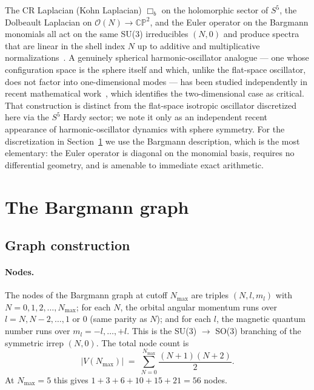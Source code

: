 \documentclass[twocolumn,pra,amsmath,amssymb,superscriptaddress]{revtex4-2}
\begin{document}
The CR Laplacian (Kohn Laplacian) $\Box_b$ on the holomorphic
sector of $S^5$, the Dolbeault Laplacian on $\mathcal{O}(N) \to
\mathbb{CP}^2$, and the Euler operator on the Bargmann monomials
all act on the same SU(3) irreducibles $(N, 0)$ and produce
spectra that are linear in the shell index $N$ up to additive and
multiplicative normalizations~\cite{follandstein1974}.  A
genuinely spherical harmonic-oscillator analogue --- one whose
configuration space is the sphere itself and which, unlike the
flat-space oscillator, does not factor into one-dimensional modes
--- has been studied independently in recent mathematical
work~\cite{higgs_pickrell2025}, which identifies the
two-dimensional case as critical.  That construction is distinct
from the flat-space isotropic oscillator discretized here via the
$S^5$ Hardy sector; we note it only as an independent recent
appearance of harmonic-oscillator dynamics with sphere symmetry.
For the
discretization in Section~\ref{sec:graph} we use the Bargmann
description, which is the most elementary: the Euler operator is
diagonal on the monomial basis, requires no differential geometry,
and is amenable to immediate exact arithmetic.

\section{The Bargmann graph}
\label{sec:graph}

\subsection{Graph construction}

\paragraph{Nodes.}
The nodes of the Bargmann graph at cutoff $N_{\max}$ are triples
$(N, l, m_l)$ with $N = 0, 1, 2, \ldots, N_{\max}$; for each $N$,
the orbital angular momentum runs over $l = N, N - 2, \ldots, 1$
or $0$ (same parity as $N$); and for each $l$, the magnetic
quantum number runs over $m_l = -l, \ldots, +l$.  This is the
SU(3) $\to$ SO(3) branching of the symmetric irrep $(N, 0)$.  The
total node count is
\begin{equation}
  |V(N_{\max})|
  \;=\;
  \sum_{N = 0}^{N_{\max}}
  \frac{(N+1)(N+2)}{2}.
  \label{eq:node-count}
\end{equation}
At $N_{\max} = 5$ this gives $1 + 3 + 6 + 10 + 15 + 21 = 56$
nodes.
\end{document}
